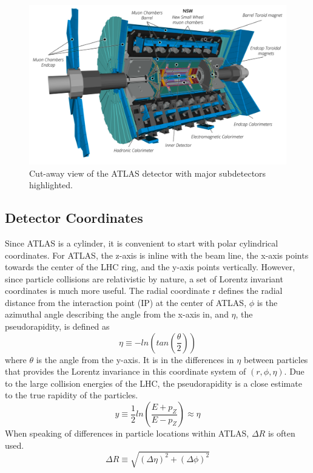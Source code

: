 	\begin{figure}[!ht]
	\centering
	\includegraphics[width=.75\textwidth,keepaspectratio=true]{chapters/chapter3_experiment/images/ATLAS_3d_run3.png}
	\caption{ Cut-away view of the ATLAS detector with major subdetectors highlighted.}
	\label{fig:ATLAS}
	\end{figure}



	\subsection{Detector Coordinates}\label{ssec:coordinates}
	Since ATLAS is a cylinder, it is convenient to start with polar cylindrical coordinates. For ATLAS, the z-axis is inline with the beam line, the x-axis points towards the center of the LHC ring, and the y-axis points vertically. However, since particle collisions are relativistic by nature, a set of Lorentz invariant coordinates is much more useful. The radial coordinate r defines the radial distance from the interaction point (IP) at the center of ATLAS, $\phi$ is the azimuthal angle describing the angle from the x-axis in, and $\eta$, the pseudorapidity, is defined as 
	\begin{equation}\label{eqn:eta}
	\eta \equiv - ln(tan(\frac{\theta}{2}))
	\end{equation}
	where $\theta$ is the angle from the y-axis. It is in the differences in $\eta$ between particles that provides the Lorentz invariance in this coordinate system of $(r,\phi,\eta)$. Due to the large collision energies of the LHC, the pseudorapidity is a close estimate to the true rapidity of the particles. 
	\begin{equation}\label{eqn:rapidity}
	y \equiv \frac{1}{2} ln(\frac{E+p_Z}{E-p_Z}) \approx \eta
	\end{equation}
	When speaking of differences in particle locations within ATLAS, $\Delta R$  is often used.
	\begin{equation}\label{eqn:dR}
	\Delta R \equiv \sqrt{ (\Delta \eta)^2 + (\Delta \phi)^2}
	\end{equation}

